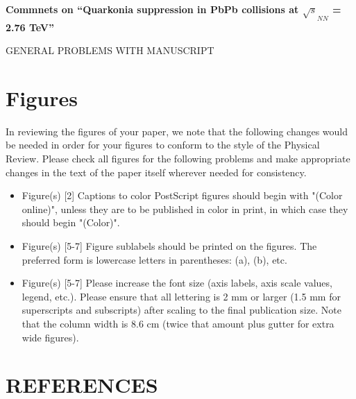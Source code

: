 \documentclass[aps,prc,preprint,superscriptaddress,showpacs,showkeys]{revtex4-1}
\begin{document}
{\Large \bf Commnets on ``Quarkonia suppression in PbPb collisions at $\sqrt s_{NN}$ =  2.76 TeV''}

\bigskip
\bigskip
\bigskip
\bigskip

{\Large GENERAL PROBLEMS WITH MANUSCRIPT}



\section{Figures}
In reviewing the figures of your paper, we note that the following
changes would be needed in order for your figures to conform to the
style of the Physical Review.  Please check all figures for the
following problems and make appropriate changes in the text of the
paper itself wherever needed for consistency.
\begin{itemize}
\item Figure(s) [2]
          Captions to color PostScript figures should begin with
          "(Color online)", unless they are to be published in
          color in print, in which case they should begin "(Color)".

\item Figure(s) [5-7]
          Figure sublabels should be printed on the figures.
          The preferred form is lowercase letters in parentheses:
          (a), (b), etc.

\item Figure(s) [5-7]
          Please increase the font size (axis labels, axis scale
          values, legend, etc.). Please ensure that all lettering is
          2 mm or larger (1.5 mm for superscripts and subscripts)
          after scaling to the final publication size. Note that
          the column width is 8.6 cm (twice that amount plus gutter
          for extra wide figures).
\end{itemize}

\section{REFERENCES}
\end{document}
